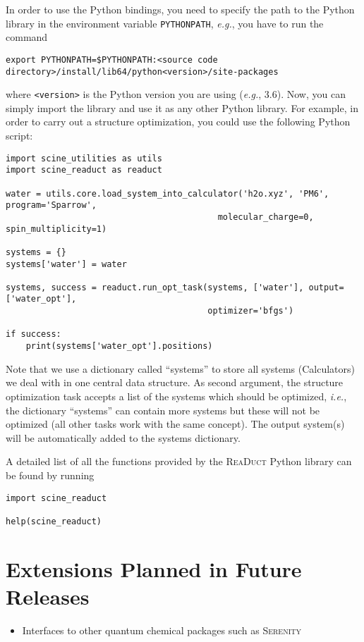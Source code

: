 \documentclass[]{tufte-book}
\begin{document}
In order to use the Python bindings, you need to specify the path to the Python library in the environment variable
\texttt{PYTHONPATH}, \textit{e.g.}, you have to run the command
\begin{verbatim}
export PYTHONPATH=$PYTHONPATH:<source code directory>/install/lib64/python<version>/site-packages
\end{verbatim}
where \texttt{<version>} is the Python version you are using (\textit{e.g.}, 3.6). Now, you can simply import the library
and use it as any other Python library. For example, in order to carry out a structure optimization, you could use the
following Python script:
\begin{verbatim}
import scine_utilities as utils
import scine_readuct as readuct

water = utils.core.load_system_into_calculator('h2o.xyz', 'PM6', program='Sparrow',
                                          molecular_charge=0, spin_multiplicity=1)

systems = {}
systems['water'] = water

systems, success = readuct.run_opt_task(systems, ['water'], output=['water_opt'],
                                        optimizer='bfgs')

if success:
    print(systems['water_opt'].positions)
\end{verbatim}
Note that we use a dictionary called ``systems'' to store all systems (Calculators) we deal with in one central data
structure. As second argument, the structure optimization task accepts a list of the systems which should be optimized,
\textit{i.e.}, the dictionary ``systems'' can contain more systems but these will not be optimized (all other tasks
work with the same concept). The output system(s) will be automatically added to the systems dictionary.

A detailed list of all the functions provided by the \textsc{ReaDuct} Python library can be found by running
\begin{verbatim}
import scine_readuct

help(scine_readuct)
\end{verbatim}



\chapter{Extensions Planned in Future Releases}
\begin{itemize}
\item Interfaces to other quantum chemical packages such as \textsc{Serenity}\cite{serenity}
\end{itemize}
\end{document}
